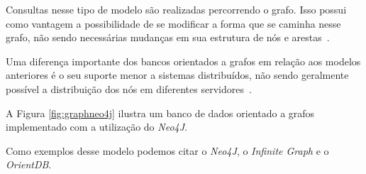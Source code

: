 Consultas nesse tipo de modelo são realizadas percorrendo o grafo. Isso possui como vantagem a possibilidade de se modificar a forma que se caminha nesse grafo, não sendo necessárias mudanças em sua estrutura de nós e arestas~\cite{pramod}.

Uma diferença importante dos bancos orientados a grafos em relação aos modelos anteriores é o seu suporte menor a sistemas distribuídos, não sendo geralmente possível a distribuição dos nós em diferentes servidores~\cite{pramod}.

A Figura \ref{fig:graphneo4j} ilustra um banco de dados orientado a grafos implementado com a utilização do \emph{Neo4J}.

Como exemplos desse modelo podemos citar o \emph{Neo4J}, o \emph{Infinite Graph} e o \emph{OrientDB}.

